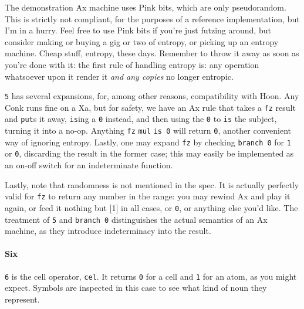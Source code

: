 \documentclass[twoside]{article}
\begin{document}
The demonstration Ax machine uses Pink bits, which are only pseudorandom. This is strictly not compliant, for the purposes of a reference implementation, but I'm in a hurry. Feel free to use Pink bits if you're just futzing around, but consider making or buying a gig or two of entropy, or picking up an entropy machine. Cheap stuff, entropy, these days. Remember to throw it away as soon as you're done with it: the first rule of handling entropy is: any operation whatsoever upon it render it \emph{and any copies} no longer entropic.



\texttt{5} has several expansions, for, among other reasons, compatibility with Hoon. Any Conk runs fine on a Xa, but for safety, we have an Ax rule that takes a \texttt{fz} result and \texttt{put}s it away, \texttt{is}ing a \texttt{0} instead, and then using the \texttt{0} to \texttt{is} the subject, turning it into a no-op. Anything \texttt{fz} \texttt{mul} \texttt{is 0} will return \texttt{0}, another convenient way of ignoring entropy. Lastly, one may expand \texttt{fz} by checking \texttt{branch 0} for \texttt{1} or \texttt{0}, discarding the result in the former case; this may easily be implemented as an on-off switch for an indeterminate function.

Lastly, note that randomness is not mentioned in the spec. It is actually perfectly valid for \texttt{fz} to return any number in the range: you may rewind Ax and play it again, or feed it nothing but [1] in all cases, or \texttt{0}, or anything else you'd like. The treatment of \texttt{5} and \texttt{branch 0} distinguishes the actual semantics of an Ax machine, as they introduce indeterminacy into the result. 


\paragraph{Six}

\texttt{6} is the cell operator, \texttt{cel}. It returns \texttt{0} for a cell and \texttt{1} for an atom, as you might expect. Symbols are inspected in this case to see what kind of noun they represent. 
\end{document}
